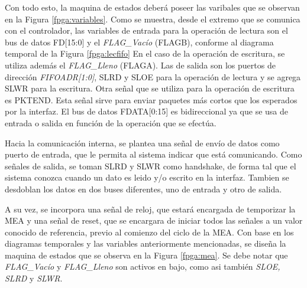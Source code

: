 Con todo esto, la maquina de estados deberá poseer las varibales que se observan en la Figura \ref{fpga:variables}. Como se muestra, desde el extremo que se comunica con el controlador, las variables de entrada para la operación de lectura son el bus de datos {FD[15:0]\it} y el {\it FLAG\_Vacío} (FLAGB), conforme al diagrama temporal de la Figura \ref{fpga:lecfifo} En el caso de la operación de escritura, se utiliza además el {\it FLAG\_Lleno} (FLAGA). Las de salida son los puertos de dirección {\it FIFOADR[1:0]}, SLRD y SLOE para la operación de lectura y se agrega SLWR para la escritura. Otra señal que se utiliza para la operación de escritura es PKTEND. Esta señal sirve para enviar paquetes más cortos que los esperados por la interfaz. El bus de datos FDATA[0:15] es bidireccional ya que se usa de entrada o salida en función de la operación que se efectúa.

Hacia la comunicación interna, se plantea una señal de envío de datos como puerto de entrada, que le permita al sistema indicar que está comunicando. Como señales de salida, se toman SLRD y SLWR como handshake, de forma tal que el sistema conozca cuando un dato es leido y/o escrito en la interfaz. Tambien se desdoblan los datos en dos buses diferentes, uno de entrada y otro de salida.

A su vez, se incorpora una señal de reloj, que estará encargada de temporizar la MEA y una señal de reset, que se encargara de iniciar todos las señales a un valor conocido de referencia, previo al comienzo del ciclo de la MEA.
Con base en los diagramas temporales y las variables anteriormente mencionadas, se diseña la maquina de estados que se observa en la Figura \ref{fpga:mea}. Se debe notar que {\it FLAG\_Vacío} y {\it FLAG\_Lleno} son activos en bajo, como asi también {\it SLOE, SLRD} y {\it SLWR}.

